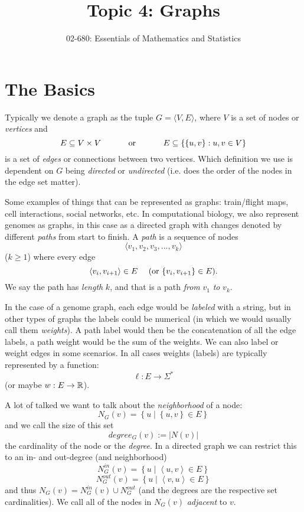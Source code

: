 


\title{Topic 4: Graphs}
\author{02-680: Essentials of Mathematics and Statistics}


\maketitle

\section{The Basics}
Typically we denote a graph as the tuple $G=\langle V, E\rangle$, 
where $V$ is a set of nodes or \emph{vertices} and 
\[E\subseteq V\times V \textnormal{\hspace{3em} or \hspace{3em}} E\subseteq \left\{\left\{u,v\right\} : u,v \in V\right\}\] 
is a set of \emph{edges} or connections between two vertices.
Which definition we use is dependent on $G$ being \emph{directed} or \emph{undirected} (i.e. does the order of the nodes in the edge set matter).  

Some examples of things that can be represented as graphs: train/flight maps, cell interactions, social networks, etc. 
In computational biology, we also represent genomes as graphs, in this case as a directed graph with changes denoted by different \emph{paths} from start to finish. 
A \textit{path} is a sequence of nodes \[\langle v_1, v_2, v_3,...,v_k \rangle\] ($k\ge 1$) where every edge \[\langle v_{i}, v_{i+1}\rangle \in E\textnormal{\hspace{1em} (or  }\{ v_{i}, v_{i+1}\} \in E\textnormal{).}\]
We say the path has \emph{length} $k$, and that is a path \textit{from} $v_1$ \textit{to} $v_k$.

In the case of a genome graph, each edge would be \emph{labeled} with a string, but in other types of graphs the labels could be numerical 
(in which we would usually call them \textit{weights}).
A path label would then be the concatenation of all the edge labels, a path weight would be the sum of the weights. 
We can also label or weight edges in some scenarios. 
In all cases weights (labels) are typically represented by a function:
\[\ell: E \rightarrow \Sigma^* \]
(or maybe $w: E \rightarrow \operatorname{\mathbb{R}}$).

A lot of talked we want to talk about the \emph{neighborhood} of a node: 
\[N_G(v) = \left\{ u \mid \left\{u,v\right\} \in E\right\}\]
and we call the size of this set \[degree_G(v) := \left|N(v)\right|\] the cardinality of the node or the \emph{degree}. 
In a directed graph we can restrict this to an in- and out-degree (and neighborhood)
\[N^{in}_G(v) = \left\{ u \mid \left\langle u,v\right\rangle \in E\right\}\]
\[N^{out}_G(v) = \left\{ u \mid \left\langle v,u\right\rangle \in E\right\}\]
and thus $N_G(v) = N^{in}_G(v) \cup N^{out}_G$ (and the degrees are the respective set cardinalities). 
We call all of the nodes in $N_G(v)$ \emph{adjacent} to $v$. 


